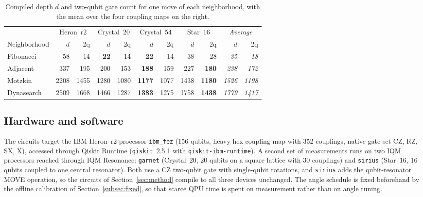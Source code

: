 \documentclass{svproc}
\begin{document}
\begin{table}[t]
\centering
\caption{Compiled depth $d$ and two-qubit gate count for one move of each
  neighborhood, with the mean over the four coupling maps on the right.}
\label{tab:depth}
\footnotesize
\setlength{\tabcolsep}{3pt}
\begin{tabular*}{\textwidth}{@{\extracolsep{\fill}}lrrrrrrrr@{\hspace{1.2em}}rr@{}}
\toprule
& \multicolumn{2}{c}{Heron~r2} & \multicolumn{2}{c}{Crystal~20}
& \multicolumn{2}{c}{Crystal~54} & \multicolumn{2}{c}{Star~16}
& \multicolumn{2}{c}{\emph{Average}} \\
\cmidrule(lr){2-3}\cmidrule(lr){4-5}\cmidrule(lr){6-7}\cmidrule(lr){8-9}\cmidrule(lr){10-11}
Neighborhood & $d$ & 2q & $d$ & 2q & $d$ & 2q & $d$ & 2q & $d$ & 2q \\
\midrule
Fibonacci  & 58   & 14   & \textbf{22}   & 14   & \textbf{22}   & 14   & 38   & 28            & \emph{35}   & \emph{18} \\
Adjacent   & 337  & 195  & 200  & 153  & \textbf{188}  & 159  & 227  & \textbf{180}  & \emph{238}  & \emph{172} \\
Motzkin    & 2208 & 1455 & 1280 & 1080 & \textbf{1177} & 1077 & 1438 & \textbf{1180} & \emph{1526} & \emph{1198} \\
Dynasearch & 2509 & 1668 & 1466 & 1287 & \textbf{1383} & 1275 & 1758 & \textbf{1438} & \emph{1779} & \emph{1417} \\
\bottomrule
\end{tabular*}
\end{table}

\subsection{Hardware and software}
\label{subsec:hw}
The circuits target the IBM Heron~r2 processor \texttt{ibm\_fez} (156
qubits, heavy-hex coupling map with 352 couplings, native gate set CZ, RZ,
SX, X), accessed through Qiskit Runtime (\texttt{qiskit}~2.5.1 with
\texttt{qiskit-ibm-runtime}). A second set of measurements runs on two IQM
processors reached through IQM Resonance: \texttt{garnet} (Crystal~20, 20
qubits on a square lattice with 30 couplings) and \texttt{sirius} (Star~16,
16 qubits coupled to one central resonator). Both use a CZ two-qubit gate
with single-qubit rotations, and \texttt{sirius} adds the qubit-resonator
MOVE operation, so the circuits of Section~\ref{sec:method} compile to all
three devices unchanged. The angle schedule is fixed beforehand by the
offline calibration of Section~\ref{subsec:fixed}, so that scarce QPU time is
spent on measurement rather than on angle tuning.
\end{document}
